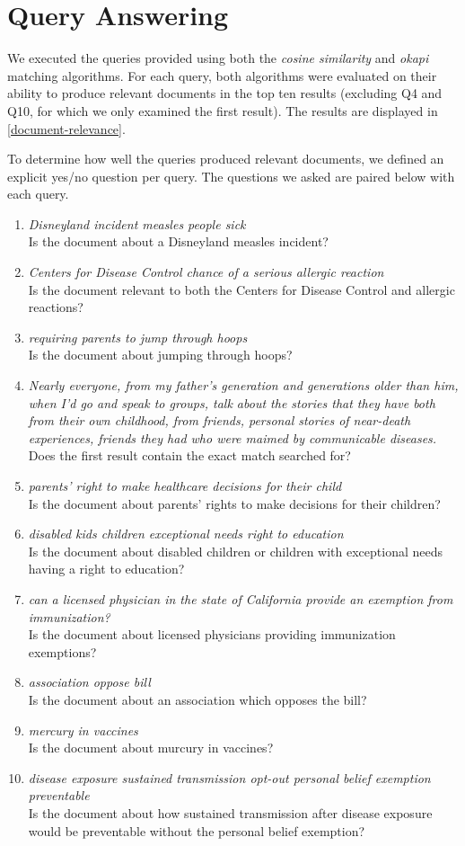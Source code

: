 \documentclass{report}
\newcommand{\query}[2]{\item\textit{#1}\\#2}
\begin{document}
\section{Query Answering}
We executed the queries provided using both the \textit{cosine
  similarity} and \textit{okapi} matching algorithms. For each query,
both algorithms were evaluated on their ability to produce relevant
documents in the top ten results (excluding Q4 and Q10, for which we only
examined the first result). The results are displayed in
\cref{document-relevance}.

To determine how well the queries produced relevant documents, we
defined an explicit yes/no question per query. The questions we asked
are paired below with each query.

\begin{enumerate}[Q1:]
  \query{Disneyland incident measles people sick}{Is the document
about a Disneyland measles incident?}

  \query{Centers for Disease Control chance of a serious allergic
reaction}{Is the document relevant to both the Centers for Disease
Control and allergic reactions?}

  \query{requiring parents to jump through hoops}{Is the document
about jumping through hoops?}

  \query{Nearly everyone, from my father's generation and generations
older than him, when I'd go and speak to groups, talk about the
stories that they have both from their own childhood, from friends,
personal stories of near-death experiences, friends they had who were
maimed by communicable diseases.}{Does the first result contain the
exact match searched for?}

  \query{parents' right to make healthcare decisions for their
child}{Is the document about parents' rights to make decisions for
their children?}

  \query{disabled kids children exceptional needs right to
education}{Is the document about disabled children or children with
exceptional needs having a right to education?}

  \query{can a licensed physician in the state of California provide
an exemption from immunization?}{Is the document about licensed
physicians providing immunization exemptions?}

  \query{association oppose bill}{Is the document about an association
which opposes the bill?}

  \query{mercury in vaccines}{Is the document about murcury in
vaccines?}

  \query{disease exposure sustained transmission opt-out personal
belief exemption preventable}{Is the document about how sustained transmission after disease exposure would be preventable without the personal belief exemption?}
\end{enumerate}
\end{document}
